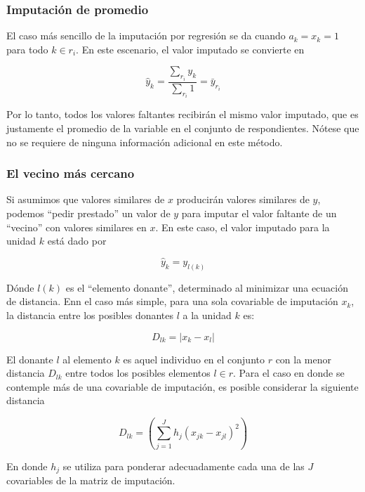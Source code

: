 \documentclass[12pt,spanish,]{book}
\begin{document}
\hypertarget{imputacion-de-promedio}{%
\subsubsection*{Imputación de promedio}\label{imputacion-de-promedio}}

El caso más sencillo de la imputación por regresión se da cuando \(a_k = x_k = 1\) para todo \(k \in r_i\). En este escenario, el valor imputado se convierte en

\[\hat{y}_k  = \frac{\sum_{r_i}y_k}{\sum_{r_i}1}= \bar{y}_{r_i}\]

Por lo tanto, todos los valores faltantes recibirán el mismo valor imputado, que es justamente el promedio de la variable en el conjunto de respondientes. Nótese que no se requiere de ninguna información adicional en este método.

\hypertarget{el-vecino-mas-cercano}{%
\subsubsection*{El vecino más cercano}\label{el-vecino-mas-cercano}}

Si asumimos que valores similares de \(x\) producirán valores similares de \(y\), podemos ``pedir prestado'' un valor de \(y\) para imputar el valor faltante de un ``vecino'' con valores similares en \(x\). En este caso, el valor imputado para la unidad \(k\) está dado por

\[\hat{y}_k = y_{l(k)}\]

Dónde \(l(k)\) es el ``elemento donante'', determinado al minimizar una ecuación de distancia. Enn el caso más simple, para una sola covariable de imputación \(x_k\), la distancia entre los posibles donantes \(l\) a la unidad \(k\) es:

\[
D_{lk} = |x_k - x_l|
\]

El donante \(l\) al elemento \(k\) es aquel individuo en el conjunto \(r\) con la menor distancia \(D_{lk}\) entre todos los posibles elementos \(l\in r\). Para el caso en donde se contemple más de una covariable de imputación, es posible considerar la siguiente distancia

\[
D_{lk} = \left( \sum_{j=1}^J h_j (x_{jk} - x_{jl})^2 \right)
\]

En donde \(h_j\) se utiliza para ponderar adecuadamente cada una de las \(J\) covariables de la matriz de imputación.
\end{document}
